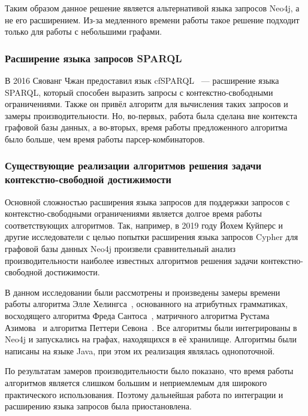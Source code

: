 Таким образом данное решение является альтернативой языка запросов Neo4j, а не его расширением. Из-за медленного времени работы такое решение подходит только для работы с небольшими графами. 

\subsubsection{Расширение языка запросов SPARQL}\label{subsection:cypher-extention-2}
В 2016 Сяованг Чжан предоставил язык cfSPARQL~\cite{zhlang-2016} --- расширение языка SPARQL, который способен выразить запросы с контекстно-свободными ограничениями. Также он привёл алгоритм для вычисления таких запросов и замеры производительности. Но, во-первых, работа была сделана вне контекста графовой базы данных, а во-вторых, время работы предложенного алгоритма было больше, чем время работы парсер-комбинаторов.

\subsubsection{Существующие реализации алгоритмов решения задачи контекстно-свободной достижимости}
Основной сложностью расширения языка запросов для поддержки запросов с контекстно-свободными ограничениями является долгое время работы соответствующих алгоритмов. Так, например, в 2019 году Йохем Куйперс и другие исследователи с целью попытки расширения языка запросов Cypher для графовой базы данных Neo4j произвели сравнительный анализ производительности наиболее известных алгоритмов решения задачи контекстно-свободной достижимости.

В данном исследовании были рассмотрены и произведены замеры времени работы алгоритма Элле Хелингса~\cite{hellings-2015}, основанного на атрибутных грамматиках, восходящего алгоритма Фреда Сантоса~\cite{santos-2018}, матричного алгоритма Рустама Азимова~\cite{Azimov:2018:CPQ:3210259.3210264} и алгоритма Петтери Севона~\cite{bio-application}. Все алгоритмы были интегрированы в Neo4j и запускались на графах, находящихся в её хранилище. Алгоритмы были написаны на языке Java, при этом их реализация являлась однопоточной.


По результатам замеров производительности было показано, что время работы алгоритмов является слишком большим и неприемлемым для широкого практического использования. Поэтому дальнейшая работа по интеграции и расширению языка запросов была приостановлена.

